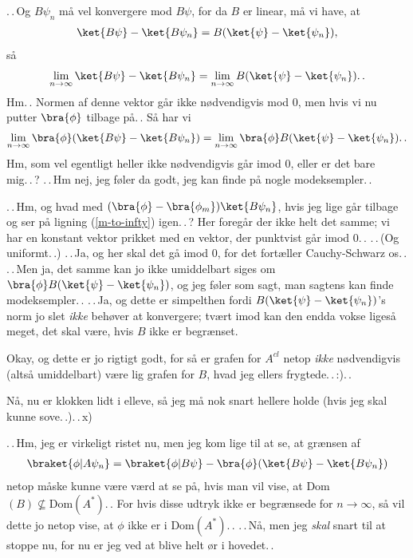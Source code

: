 \documentclass{report}
\begin{document}
.\,.\,Og $B\psi_n$ må vel konvergere mod $B \psi$, for da $B$ er linear, må vi have, at
\begin{align}
\begin{aligned}
	\ket{B \psi} - \ket{B \psi_n} = B (\ket{\psi} - \ket{\psi_n}),
\end{aligned}
\end{align}
så 
\begin{align}
\begin{aligned}
	\lim_{n\to\infty} \ket{B \psi} - \ket{B \psi_n} = \lim_{n\to\infty} B (\ket{\psi} - \ket{\psi_n}).\,.
\end{aligned}
\end{align}
Hm.\,. Normen af denne vektor går ikke nødvendigvis mod 0, men hvis vi nu putter $\bra{\phi}$ tilbage på.\,. Så har vi
\begin{align}
\begin{aligned}
\lim_{n\to\infty} \bra{\phi}(\ket{B \psi} - \ket{B \psi_n}) = \lim_{n\to\infty} \bra{\phi} B (\ket{\psi} - \ket{\psi_n}).\,.
\end{aligned}
\end{align}
Hm, som vel egentligt heller ikke nødvendigvis går imod 0, eller er det bare mig.\,.\,? .\,.\,Hm nej, jeg føler da godt, jeg kan finde på nogle modeksempler.\,. 

.\,.\,Hm, og hvad med $(\bra{\phi} - \bra{\phi_m})\ket{B \psi_n}$, hvis jeg lige går tilbage og ser på ligning (\ref{m-to-infty}) igen.\,.\,? Her foregår der ikke helt det samme; vi har en konstant vektor prikket med en vektor, der punktvist går imod 0.\,. .\,.\,(Og uniformt.\,.) .\,.\,Ja, og her skal det gå imod 0, for det fortæller Cauchy-Schwarz os.\,. .\,.\,Men ja, det samme kan jo ikke umiddelbart siges om $\bra{\phi} B (\ket{\psi} - \ket{\psi_n})$, og jeg føler som sagt, man sagtens kan finde modeksempler.\,. .\,.\,Ja, og dette er simpelthen fordi $B (\ket{\psi} - \ket{\psi_n})$'s norm jo slet \emph{ikke} behøver at konvergere; tvært imod kan den endda vokse ligeså meget, det skal være, hvis $B$ ikke er begrænset.  

Okay, og dette er jo rigtigt godt, for så er grafen for $A^{cl}$ netop \emph{ikke} nødvendigvis (altså umiddelbart) være lig grafen for $B$, hvad jeg ellers frygtede.\,.\,:).\,.

Nå, nu er klokken lidt i elleve, så jeg må nok snart hellere holde (hvis jeg skal kunne sove.\,.).\,.\,x) 

.\,.\,Hm, jeg er virkeligt ristet nu, men jeg kom lige til at se, at grænsen af
\begin{align}
\begin{aligned}
\braket{\phi | A \psi_n} = 
	\braket{\phi | B\psi} - \bra{\phi}(\ket{B \psi} - \ket{B \psi_n})
\end{aligned}
\end{align}
netop måske kunne være værd at se på, hvis man vil vise, at Dom$(B) \nsubseteq \mathrm{Dom}(A^*)$.\,. For hvis disse udtryk ikke er begrænsede for $n\to\infty$, så vil dette jo netop vise, at $\phi$ ikke er i $\mathrm{Dom}(A^*)$.\,. .\,.\,Nå, men jeg \emph{skal} snart til at stoppe nu, for nu er jeg ved at blive helt ør i hovedet.\,. 
\end{document}
